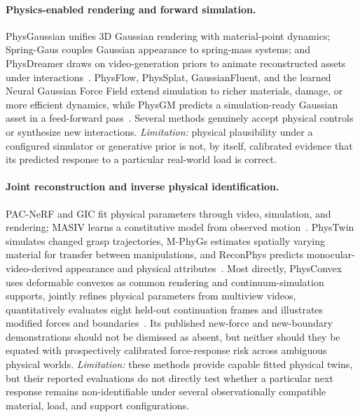 \documentclass[10pt,twocolumn,letterpaper]{article}
\begin{document}
\paragraph{Physics-enabled rendering and forward simulation.}
PhysGaussian unifies 3D Gaussian rendering with material-point dynamics; Spring-Gaus couples Gaussian appearance to spring-mass systems; and PhysDreamer draws on video-generation priors to animate reconstructed assets under interactions~\cite{xie2024physgaussian,zhong2024springgaus,zhang2024physdreamer}. PhysFlow, PhysSplat, GaussianFluent, and the learned Neural Gaussian Force Field extend simulation to richer materials, damage, or more efficient dynamics, while PhysGM predicts a simulation-ready Gaussian asset in a feed-forward pass~\cite{liu2025physflow,zhao2025physsplat,huang2026gaussianfluent,li2026ngff,lv2026physgm}. Several methods genuinely accept physical controls or synthesize new interactions. \emph{Limitation:} physical plausibility under a configured simulator or generative prior is not, by itself, calibrated evidence that its predicted response to a particular real-world load is correct.

\paragraph{Joint reconstruction and inverse physical identification.}
PAC-NeRF and GIC fit physical parameters through video, simulation, and rendering; MASIV learns a constitutive model from observed motion~\cite{li2023pacnerf,cai2024gic,zhao2025masiv}. PhysTwin simulates changed grasp trajectories, M-PhyGs estimates spatially varying material for transfer between manipulations, and ReconPhys predicts monocular-video-derived appearance and physical attributes~\cite{jiang2025phystwin,wada2026mphygs,wang2026reconphys}. Most directly, PhysConvex uses deformable convexes as common rendering and continuum-simulation supports, jointly refines physical parameters from multiview videos, quantitatively evaluates eight held-out continuation frames and illustrates modified forces and boundaries~\cite{wang2026physconvex}. Its published new-force and new-boundary demonstrations should not be dismissed as absent, but neither should they be equated with prospectively calibrated force-response risk across ambiguous physical worlds. \emph{Limitation:} these methods provide capable fitted physical twins, but their reported evaluations do not directly test whether a particular next response remains non-identifiable under several observationally compatible material, load, and support configurations.
\end{document}
